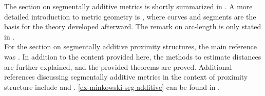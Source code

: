 \begin{sourcescontribs}
  The section on segmentally additive metrics is shortly summarized in \textcite[Chapter 12.3.1, pp. 52-57]{foundations2}. A more detailed introduction to metric geometry is \textcite[Chapter 1, pp. 1-64]{busemann}, where curves and segments are the basis for the theory developed afterward. The remark on arc-length is only stated in \textcite[p. 21]{busemann}.\\
  For the section on segmentally additive proximity structures, the main reference was \textcite[Chapter 14.2, pp. 163-174]{foundations2}. In addition to the content provided here, the methods to estimate distances are further explained, and the provided theorems are proved.
  Additional references discussing segmentally additive metrics in the context of proximity structure include \textcite{tversky1970dimensional} and \textcite{foundationsMDS}.
  \cref{ex-minkowski-seg-additive} can be found in \textcite[p. 588]{tversky1970dimensional}.
\end{sourcescontribs}
